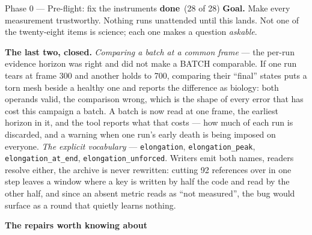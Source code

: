 \documentclass[11pt,a4paper]{article}
\newcommand{\code}[1]{\texttt{#1}}
\newcommand{\dn}{\textcolor{good}{\textbf{done}}}
\begin{document}
\begin{phasebox}{Phase 0 --- Pre-flight: fix the instruments \hfill \dn\ (28 of 28)}
\textbf{Goal.} Make every measurement trustworthy. Nothing runs unattended until this lands. Not one
of the twenty-eight items is science; each one makes a question \emph{askable}.

\textbf{The last two, closed.} \emph{Comparing a batch at a common frame} --- the per-run evidence
horizon was right and did not make a BATCH comparable. If one run tears at frame 300 and another
holds to 700, comparing their ``final'' states puts a torn mesh beside a healthy one and reports
the difference as biology: both operands valid, the comparison wrong, which is the shape of every
error that has cost this campaign a batch. A batch is now read at one frame, the earliest horizon
in it, and the tool reports what that costs --- how much of each run is discarded, and a warning
when one run's early death is being imposed on everyone. \emph{The explicit vocabulary} ---
\code{elongation}, \code{elongation\_peak}, \code{elongation\_at\_end}, \code{elongation\_unforced}.
Writers emit both names, readers resolve either, the archive is never rewritten: cutting 92
references over in one step leaves a window where a key is written by half the code and read by the
other half, and since an absent metric reads as ``not measured'', the bug would surface as a round
that quietly learns nothing.

\textbf{The repairs worth knowing about}


\end{phasebox}
\end{document}
